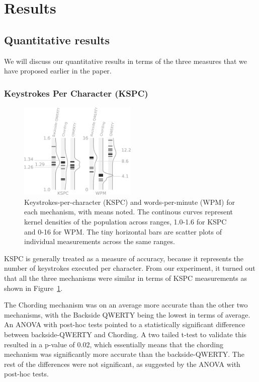 \section{Results}
\subsection{Quantitative results}

We will discuss our quantitative results in terms of the three
measures that we have proposed earlier in the paper.

\subsubsection{Keystrokes Per Character (KSPC)}

\begin{figure}
    \includegraphics[width=0.5\textwidth]{Figures/kspc_and_wpm.pdf} 
    \caption{Keystrokes-per-character (KSPC) and words-per-minute (WPM) for each mechanism, with means noted. The continous curves represent kernel densities of the population across ranges, 1.0-1.6 for KSPC and 0-16 for WPM. The tiny horizontal bars are scatter plots of individual measurements across the same ranges.}
    \label{fig:kspc_and_wpm}
\end{figure}

KSPC is generally treated as a measure of accuracy, because it
represents the number of keystrokes executed per character. From our
experiment, it turned out that all the three mechanisms were similar
in terms of KSPC measurements as shown in
Figure~\ref{fig:kspc_and_wpm}.

The Chording mechanism was on an average more accurate than the other two
mechanisms, with the Backside QWERTY being the lowest in terms of
average. An ANOVA with post-hoc tests pointed to a  statistically significant difference between backside-QWERTY and Chording. A two tailed t-test to validate this resulted in a p-value of 0.02, which essentially means that the chording mechanism was significantly more accurate than the backside-QWERTY. The rest of the differences were not significant, as suggested by the ANOVA with post-hoc tests. 

